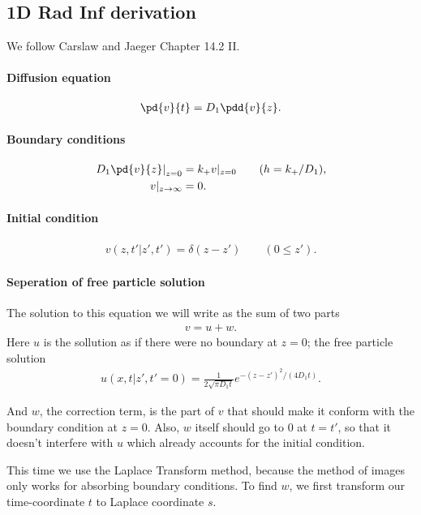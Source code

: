 \subsection{1D Rad Inf derivation}

We follow Carslaw and Jaeger Chapter 14.2 II.


\paragraph{Diffusion equation}
\begin{align}
  \pd{v}{t} = D_1 \pdd{v}{z}.
\end{align}


\paragraph{Boundary conditions}
\begin{align}
  \left.D_1\pd{v}{z}\right |_{z=0} &= k_+ v|_{z=0}
  \qquad (h = k_+/D_1),\\
  v |_{z\to\infty}&=0.
\end{align} 


\paragraph{Initial condition}
\begin{align}
  v(z,t'|z',t') = \delta(z-z') \qquad (0 \leq z').
\end{align}


\paragraph{Seperation of free particle solution}
The solution to this equation we will write as the sum of two parts
\begin{align}
  v=u+w.
\end{align}
Here $u$ is the sollution as if there were no boundary at $z=0$; the free 
particle solution
\begin{align}
  u(x,t|z',t'=0) = \frac{1}{2\sqrt{\pi D_1t}} e^{-(z-z')^2/(4 D_1 t)}.
\end{align}

And $w$, the correction term, is the part of $v$ that should make it conform 
with the boundary condition at $z=0$. Also, $w$ itself should go to $0$ at 
$t=t'$, so that it doesn't interfere with $u$ which already accounts for the 
initial condition.  

This time we use the Laplace Transform method, because the method of images 
only works for absorbing boundary conditions. To find $w$, we first transform 
our time-coordinate $t$ to Laplace coordinate $s$.


